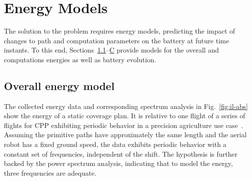 \documentclass[letterpaper,10pt,journal,twoside]{IEEEtran}
\theoremstyle{definition}
\newtheorem{defn}{Definition}[section]
\newtheorem*{pb}{Problem}%
\begin{document}





\section{Energy Models}  %
\label{sec:energy-model} %
The solution to the problem requires energy models, predicting the impact of changes to path and computation parameters on the battery at future time instants. To this end, Sections~\ref{sec:mod-mot}--\hyperref[sec:mod-bat]{C} provide models for the overall and computations energies as well as battery evolution.

\subsection{Overall energy model%
}
\label{sec:mod-mot}

The collected energy data and corresponding spectrum analysis in Fig.~\ref{fig:il-abs} show the energy of a static coverage plan. It is relative to one flight of a series of flights for CPP exhibiting periodic behavior in a precision agriculture use case~\cite{seewald2020mechanical}. %
Assuming the primitive paths have approximately the same length and the aerial robot has a fixed ground speed, the data exhibits periodic behavior with a constant set of frequencies, independent of the shift. The hypothesis is further backed by the power spectrum analysis, indicating that to model the energy, three frequencies are adequate.
\end{document}
